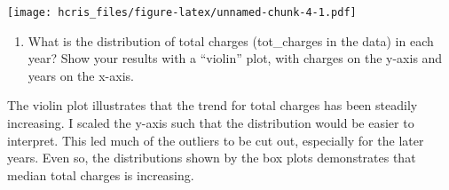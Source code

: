 \documentclass[
]{article}
\providecommand{\tightlist}{%
  \setlength{\itemsep}{0pt}\setlength{\parskip}{0pt}}
\begin{document}
\texttt{[image: hcris\_files/figure-latex/unnamed-chunk-4-1.pdf]}

\begin{enumerate}
\def\labelenumi{\arabic{enumi}.}
\setcounter{enumi}{3}
\tightlist
\item
  What is the distribution of total charges (tot\_charges in the data)
  in each year? Show your results with a ``violin'' plot, with charges
  on the y-axis and years on the x-axis.
\end{enumerate}

The violin plot illustrates that the trend for total charges has been
steadily increasing. I scaled the y-axis such that the distribution
would be easier to interpret. This led much of the outliers to be cut
out, especially for the later years. Even so, the distributions shown by
the box plots demonstrates that median total charges is increasing.
\end{document}
